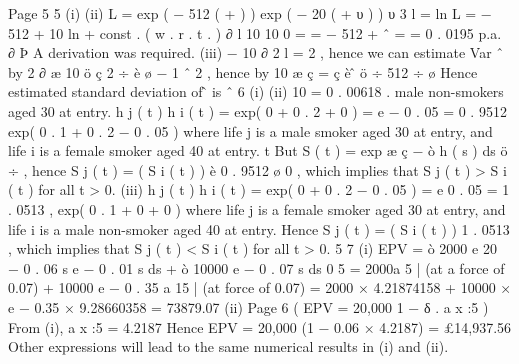 
\newpage

Page 5%
5
(i)
(ii)
L = exp ( − 512 ( \sigma + \mu ) ) exp ( − 20 ( \rho + υ ) )    υ 3
l = ln L = − 512 \sigma + 10 ln \sigma + const . ( w . r . t . \sigma )
∂ l
10
10
0 =
= − 512 +
\sigma ˆ =
= 0 . 0195 p.a.
∂ \sigma
{}
Þ
A derivation was required.
(iii)
−
10
∂ 2 l
= 2 , hence we can estimate Var \sigma ˆ by
2
∂ \sigma
\sigma
æ 10 ö
ç 2 ÷
è \sigma ø
− 1
\sigma ˆ 2
, hence by
10
æ
ç =
ç
è
\sigmâ ö
÷
512 ÷ ø
Hence estimated standard deviation of \sigmâ is \sigma ˆ
6
(i)
(ii)
10 = 0 . 00618 .
male non-smokers aged 30 at entry.
h j ( t )
h i ( t )
=
exp( 0 + 0 . 2 + 0 )
= e − 0 . 05 = 0 . 9512
exp( 0 . 1 + 0 . 2 − 0 . 05 )
where life j is a male smoker aged 30 at entry, and
life i is a female smoker aged 40 at entry.
t
But S ( t ) = exp æ ç − ò h ( s ) ds ö ÷ , hence
S j ( t ) = ( S i ( t ) )
è
0 . 9512
ø
0
, which implies that
S j ( t ) > S i ( t ) for all t > 0.
(iii)
h j ( t )
h i ( t )
=
exp( 0 + 0 . 2 − 0 . 05 )
= e 0 . 05 = 1 . 0513 ,
exp( 0 . 1 + 0 + 0 )
where life j is a female smoker aged 30 at entry, and
life i is a male non-smoker aged 40 at entry.
Hence S j ( t ) = ( S i ( t ) )
1 . 0513
, which implies that
S j ( t ) < S i ( t ) for all t > 0.
5
7
(i)
EPV = ò 2000 e
20
− 0 . 06 s
e
− 0 . 01 s
ds + ò 10000 e − 0 . 07 s ds
0
5
= 2000a 5 | (at a force of 0.07) + 10000 e − 0 . 35 a 15 | (at force of 0.07)
= 2000 × 4.21874158 + 10000 × e − 0.35 × 9.28660358 = 73879.07
(ii)
Page 6
(
EPV = 20,000 1 − δ . a x :5
)%
From (i), a x :5 = 4.2187
Hence EPV = 20,000 (1 − 0.06 × 4.2187) = £14,937.56
Other expressions will lead to the same numerical results in (i) and (ii).
